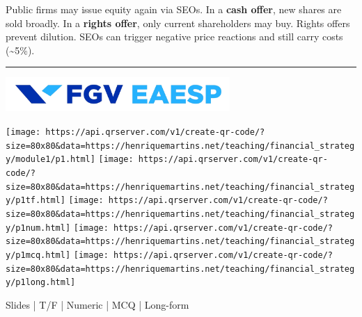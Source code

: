 \documentclass[
  9pt,
  letterpaper,
  DIV=11,
  numbers=noendperiod]{scrartcl}
\begin{document}
Public firms may issue equity again via SEOs. In a \textbf{cash offer},
new shares are sold broadly. In a \textbf{rights offer}, only current
shareholders may buy. Rights offers prevent dilution. SEOs can trigger
negative price reactions and still carry costs (\textasciitilde5\%).

\begin{center}\rule{0.5\linewidth}{0.5pt}\end{center}

\begin{center}
\includegraphics[height=1.3cm]{../figs/background6.png}
\end{center}

\begin{center}
\texttt{[image: https://api.qrserver.com/v1/create-qr-code/?size=80x80\&data=https://henriquemartins.net/teaching/financial\_strategy/module1/p1.html]}
\texttt{[image: https://api.qrserver.com/v1/create-qr-code/?size=80x80\&data=https://henriquemartins.net/teaching/financial\_strategy/p1tf.html]}
\texttt{[image: https://api.qrserver.com/v1/create-qr-code/?size=80x80\&data=https://henriquemartins.net/teaching/financial\_strategy/p1num.html]}
\texttt{[image: https://api.qrserver.com/v1/create-qr-code/?size=80x80\&data=https://henriquemartins.net/teaching/financial\_strategy/p1mcq.html]}
\texttt{[image: https://api.qrserver.com/v1/create-qr-code/?size=80x80\&data=https://henriquemartins.net/teaching/financial\_strategy/p1long.html]}
\end{center}

\begin{center}
{\footnotesize Slides | T/F | Numeric | MCQ | Long-form}
\end{center}
\end{document}
